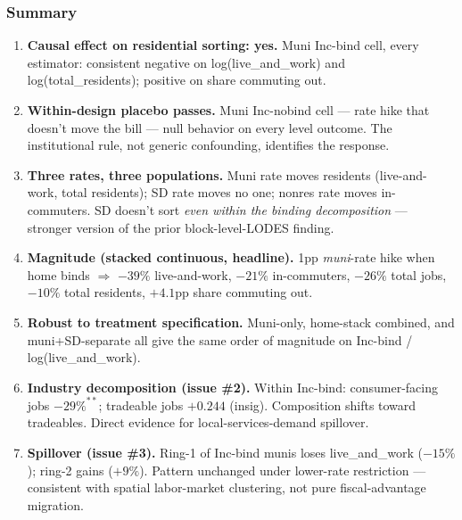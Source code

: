 \documentclass[xcolor = x11names, compress, aspectratio = 169]{beamer}
\begin{document}
    \begin{frame}
    \frametitle{Summary}
        \begin{enumerate}\setlength{\itemsep}{0.08cm}\footnotesize
            \item \textbf{Causal effect on residential sorting: yes.}
            Muni Inc-bind cell, every estimator: consistent negative on
            log(live\_and\_work) and log(total\_residents); positive on
            share commuting out.
            \item \textbf{Within-design placebo passes.} Muni Inc-nobind
            cell --- rate hike that doesn't move the bill --- null behavior
            on every level outcome. The institutional rule, not generic
            confounding, identifies the response.
            \item \textbf{Three rates, three populations.} Muni rate
            moves residents (live-and-work, total residents); SD rate
            moves no one; nonres rate moves in-commuters.
            SD doesn't sort \emph{even within the binding decomposition} ---
            stronger version of the prior block-level-LODES finding.
            \item \textbf{Magnitude (stacked continuous, headline).}
            1pp \emph{muni}-rate hike when home binds $\Rightarrow$
            $-39\%$ live-and-work, $-21\%$ in-commuters, $-26\%$ total jobs,
            $-10\%$ total residents, $+4.1$pp share commuting out.
            \item \textbf{Robust to treatment specification.} Muni-only,
            home-stack combined, and muni+SD-separate all give the same
            order of magnitude on Inc-bind / log(live\_and\_work).
            \item \textbf{Industry decomposition (issue \#2).} Within Inc-bind:
            consumer-facing jobs $-29\%^{**}$; tradeable jobs $+0.244$ (insig).
            Composition shifts toward tradeables. Direct evidence for
            local-services-demand spillover.
            \item \textbf{Spillover (issue \#3).} Ring-1 of Inc-bind munis
            loses live\_and\_work ($-15\%$); ring-2 gains ($+9\%$). Pattern
            unchanged under lower-rate restriction --- consistent with
            spatial labor-market clustering, not pure fiscal-advantage
            migration.
        \end{enumerate}
    \end{frame}
\end{document}
